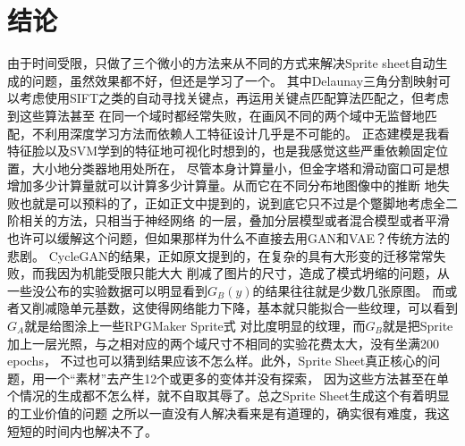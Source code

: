 \documentclass[twocolumn,11pt]{ctexart}
\begin{document}
\section{结论}

由于时间受限，只做了三个微小的方法来从不同的方式来解决Sprite sheet自动生成的问题，虽然效果都不好，但还是学习了一个。
其中Delaunay三角分割映射可以考虑使用SIFT之类的自动寻找关键点，再运用关键点匹配算法匹配之，但考虑到这些算法甚至
在同一个域时都经常失败，在画风不同的两个域中无监督地匹配，不利用深度学习方法而依赖人工特征设计几乎是不可能的。
正态建模是我看特征脸以及SVM学到的特征地可视化时想到的，也是我感觉这些严重依赖固定位置，大小地分类器地用处所在，
尽管本身计算量小，但金字塔和滑动窗口可是想增加多少计算量就可以计算多少计算量。从而它在不同分布地图像中的推断
地失败也就是可以预料的了，正如正文中提到的，说到底它只不过是个蹩脚地考虑全二阶相关的方法，只相当于神经网络
的一层，叠加分层模型或者混合模型或者平滑也许可以缓解这个问题，但如果那样为什么不直接去用GAN和VAE？传统方法的悲剧。
CycleGAN的结果，正如原文\cite{zhu2017unpaired}提到的，在复杂的具有大形变的迁移常常失败，而我因为机能受限只能大大
削减了图片的尺寸，造成了模式坍缩的问题，从一些没公布的实验数据可以明显看到$G_B(y)$的结果往往就是少数几张原图。
而或者又削减隐单元基数，这使得网络能力下降，基本就只能拟合一些纹理，可以看到$G_A$就是给图涂上一些RPGMaker Sprite式
对比度明显的纹理，而$G_B$就是把Sprite加上一层光照，与之相对应的两个域尺寸不相同的实验花费太大，没有坐满200 epochs，
不过也可以猜到结果应该不怎么样。此外，Sprite Sheet真正核心的问题，用一个“素材”去产生12个或更多的变体并没有探索，
因为这些方法甚至在单个情况的生成都不怎么样，就不自取其辱了。总之Sprite Sheet生成这个有着明显的工业价值的问题
之所以一直没有人解决看来是有道理的，确实很有难度，我这短短的时间内也解决不了。

 

%
\end{document}
